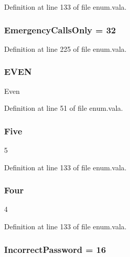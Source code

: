 Definition at line 133 of file enum.\-vala.

\hypertarget{enum_8vala_ad257fe2f6eb1d34148dad08c271622cd}{
\subsubsection[{Emergency\-Calls\-Only}]{\setlength{\rightskip}{0pt plus 5cm}Emergency\-Calls\-Only = 32}}\label{enum_8vala_ad257fe2f6eb1d34148dad08c271622cd}


Definition at line 225 of file enum.\-vala.

\hypertarget{enum_8vala_a145aefc9eb0f54174786b9acc7854c39}{
\subsubsection[{E\-V\-E\-N}]{\setlength{\rightskip}{0pt plus 5cm}E\-V\-E\-N}}\label{enum_8vala_a145aefc9eb0f54174786b9acc7854c39}
Even 

Definition at line 51 of file enum.\-vala.

\hypertarget{enum_8vala_aee61276f9005313515feb62138be2b8c}{
\subsubsection[{Five}]{\setlength{\rightskip}{0pt plus 5cm}Five}}\label{enum_8vala_aee61276f9005313515feb62138be2b8c}
5 

Definition at line 133 of file enum.\-vala.

\hypertarget{enum_8vala_a3ffdf73f4d6c86cda4741740d081325c}{
\subsubsection[{Four}]{\setlength{\rightskip}{0pt plus 5cm}Four}}\label{enum_8vala_a3ffdf73f4d6c86cda4741740d081325c}
4 

Definition at line 133 of file enum.\-vala.

\hypertarget{enum_8vala_a7099da7ea6db5fb7ba2e9d0a9df6d029}{
\subsubsection[{Incorrect\-Password}]{\setlength{\rightskip}{0pt plus 5cm}Incorrect\-Password = 16}}\label{enum_8vala_a7099da7ea6db5fb7ba2e9d0a9df6d029}


